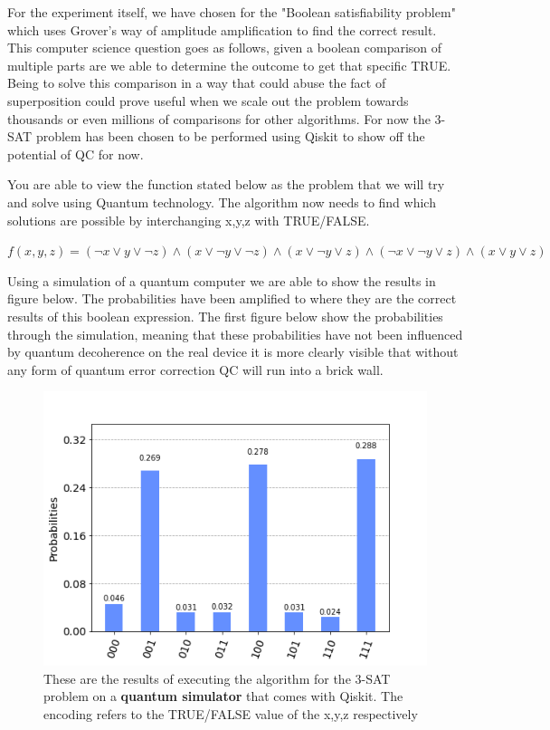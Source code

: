 For the experiment itself, we have chosen for the "Boolean satisfiability problem" which uses Grover's way of amplitude amplification to find the correct result. This computer science question goes as follows, given a boolean comparison of multiple parts are we able to determine the outcome to get that specific TRUE. Being to solve this comparison in a way that could abuse the fact of superposition could prove useful when we scale out the problem towards thousands or even millions of comparisons for other algorithms. For now the 3-SAT problem has been chosen to be performed using Qiskit to show off the potential of QC for now.

You are able to view the function stated below as the problem that we will try and solve using Quantum technology. The algorithm now needs to find which solutions are possible by interchanging x,y,z with TRUE/FALSE.

$ f(x,y,z) = (\neg x \vee y \vee \neg z) \wedge  ( x \vee \neg y \vee \neg z) \wedge ( x \vee \neg y \vee  z) \wedge (\neg x \vee \neg y \vee z) \wedge  ( x \vee y \vee  z)	 $
				 
Using a simulation of a quantum computer we are able to show the results in figure below. The probabilities have been amplified to where they are the correct results of this boolean expression. The first figure below show the probabilities through the simulation, meaning that these probabilities have not been influenced by quantum decoherence on the real device it is more clearly visible that without any form of quantum error correction QC will run into a brick wall. 

\begin{figure}[h]
	\centering
	\includegraphics[scale = 0.75]{../Demonstration/img/simulated_3SAT.PNG}
	\caption{These are the results of executing the algorithm for the 3-SAT problem on a \textbf{quantum simulator} that comes with Qiskit. The encoding refers to the TRUE/FALSE value of the x,y,z respectively}
\end{figure}

